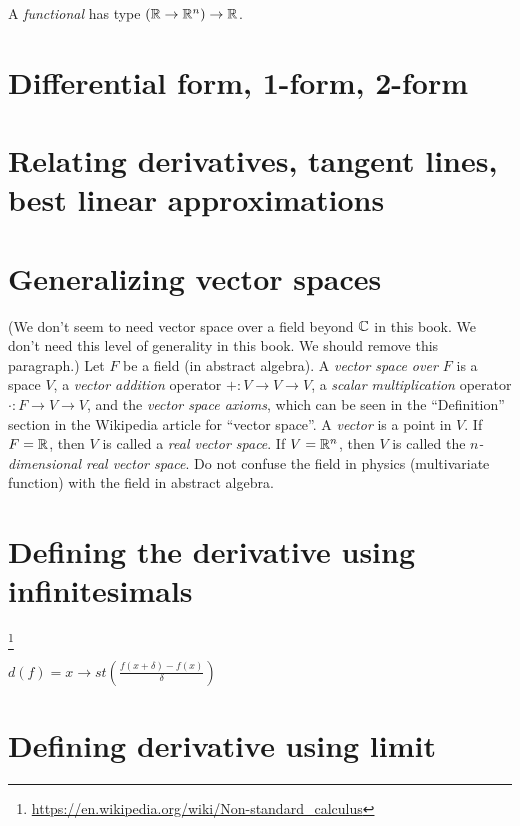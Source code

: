 A \emph{functional} has type \( (\mathbb{R} \to \mathbb{R}^n) \to \mathbb{R} \).

\section{Differential form, 1-form, 2-form}


\section{Relating derivatives, tangent lines, best linear approximations}

\section{Generalizing vector spaces}

(We don't seem to need vector space over a field beyond \(\mathbb{C}\) in this book.
We don't need this level of generality in this book.
We should remove this paragraph.)
Let \(F\) be a field (in abstract algebra).
A \emph{vector space over \(F\)} is a space \( V \), a \emph{vector addition} operator \( + : V \to V \to V \),
a \emph{scalar multiplication} operator \( \cdot : F \to V \to V \), and the \emph{vector space axioms},
which can be seen in the \enquote{Definition} section in the Wikipedia article for \enquote{vector space}.
A \emph{vector} is a point in \( V \).
If \( F = \mathbb{R} \), then \( V \) is called a \emph{real vector space}.
If \( V = \mathbb{R}^n \), then \( V \) is called the \emph{\(n\)-dimensional real vector space}.
Do not confuse the field in physics (multivariate function) with the field in abstract algebra.

\section{Defining the derivative using infinitesimals}

\footnote{\url{https://en.wikipedia.org/wiki/Non-standard_calculus}}

%
\( d(f) = x \to st\left(\frac{f(x+\delta)-f(x)}{\delta}\right) \)

\section{Defining derivative using limit}


